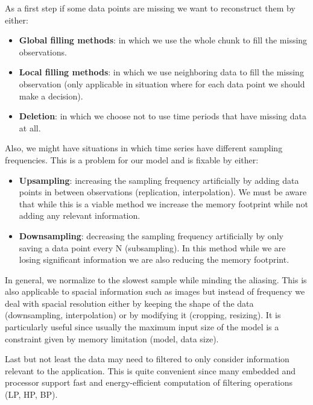 \documentclass{article}
\begin{document}
        As a first step if some data points are missing we want to reconstruct them by either:
        \begin{itemize}
          \item \textbf{Global filling methods}: in which we use the whole chunk to fill the missing observations.
          \item \textbf{Local filling methods}: in which we use neighboring data to fill the missing observation (only applicable in situation where for each data point we should make a decision).
          \item \textbf{Deletion}: in which we choose not to use time periods that have missing data at all.
        \end{itemize}

        Also, we might have situations in which time series have different sampling frequencies. This is a problem for our model and is fixable by either:
        \begin{itemize}
          \item \textbf{Upsampling}: increasing the sampling frequency artificially by adding data points in between observations (replication, interpolation). We must be aware that while this is a
          viable method we increase the memory footprint while not adding any relevant information.
          \item \textbf{Downsampling}: decreasing the sampling frequency artificially by only saving a data point every N (subsampling). In this method while we are losing significant information we are also reducing the memory footprint.
        \end{itemize}
        In general, we normalize to the slowest sample while minding the aliasing. This is also applicable to spacial information such as images but instead of frequency we deal with spacial resolution either by keeping the shape of the data (downsampling, interpolation) or by modifying it (cropping, resizing).
        It is particularly useful since usually the maximum input size of the model is a constraint given by memory limitation (model, data size).

        Last but not least the data may need to filtered to only consider information relevant to the application. This is quite convenient since many embedded and processor support fast and energy-efficient computation of filtering operations (LP, HP, BP).
    
\end{document}
